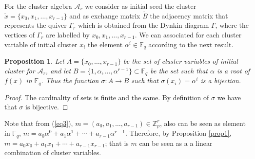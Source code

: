 \documentclass[12pt,a4paper]{article}
\newtheorem{Proposition}[Theorem]{Proposition}
\begin{document}
For the cluster algebra  $\mathcal{A}_r$ we consider as initial seed the cluster $\tilde{x}=\lbrace x_0,x_1,\ldots,x_{r-1} \rbrace$ and as exchange matrix $\tilde{B}$ the adjacency matrix that represents the quiver $\Gamma_r$ which is obtained from the  Dynkin diagram $\Gamma$, where the vertices of $\Gamma_r$ are labelled by $x_0,x_1,\ldots,x_{r-1}$. We can associated for each cluster variable of initial cluster $x_i$ the element $\alpha^i \in \mathbb{F}_q$ according to the next result.

\begin{Proposition}\label{bijection}
Let  $A=\lbrace x_0,\ldots, x_{r-1} \rbrace$ be the set of cluster variables of initial cluster for $\mathcal{A}_r$, and let  $B=\{1,\alpha,\ldots,\alpha^{r-1}\}\subset \mathbb{F}_q$ be the set such that $\alpha$ is a root of $f(x)$ in $\mathbb{F}_q$. Thus the function $\sigma: A \rightarrow B$ such that $\sigma(x_i)=\alpha^i$ is a bijection.
\label{prop1} 
\end{Proposition}

\begin{proof}
The cardinality of sets is finite and the same. By definition of $\sigma$  we have  that $\sigma$ is bijective.
\end{proof}

Note that from (\ref{eq3}), $m=(a_0,a_1,\ldots,a_{r-1}) \in \mathbb{Z}_p^r$, also can be seen as element in $\mathbb{F}_q$, $m= a_0\alpha^0+a_1\alpha^1 + \cdots + a_{r-1}\alpha^{r-1}$. Therefore, by Proposition \ref{prop1}, $m= a_0x_0+a_1x_1 + \cdots + a_{r-1}x_{r-1}$; that is $m$ can be seen as a a linear combination of cluster variables. 





\end{document}
